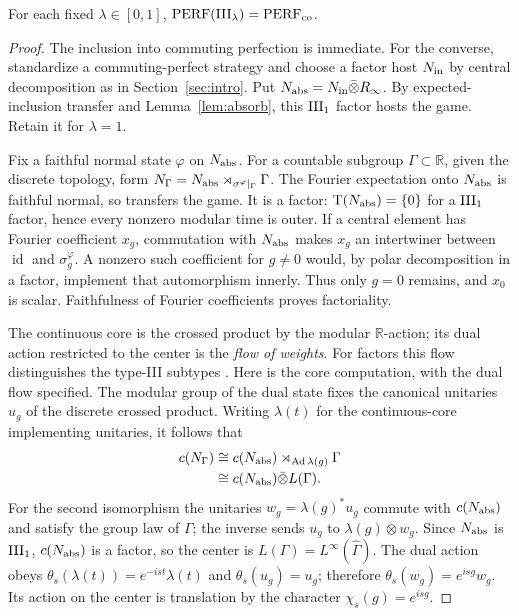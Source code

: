 \begin{theorem}\label{thm:III}
For each fixed $\lambda\in[0,1]$,
$\mathrm{PERF}(\mathrm{III}_\lambda)=\mathrm{PERF}_{\mathrm{co}}$.
\end{theorem}
\begin{proof}
The inclusion into commuting perfection is immediate.
For the converse, standardize a commuting-perfect strategy and
choose a factor host $N_{\rm in}$ by central decomposition as in
Section~\ref{sec:intro}. Put $N_{\rm abs}=N_{\rm in}\bar\otimes R_\infty$.
By expected-inclusion transfer and Lemma~\ref{lem:absorb}, this $\mathrm{III}_1$
factor hosts the game. Retain it for $\lambda=1$.

Fix a faithful normal state $\varphi$ on $N_{\rm abs}$.
For a countable subgroup $\Gamma\subset\mathbb R$, given the discrete
topology, form
$N_\Gamma=N_{\rm abs}\rtimes_{\sigma^\varphi|_\Gamma}\Gamma$.
The Fourier expectation onto $N_{\rm abs}$ is faithful normal, so transfers
the game. It is a factor: $\mathrm T(N_{\rm abs})=\{0\}$ for a $\mathrm{III}_1$ factor, hence
every nonzero modular time is outer.
If a central element has Fourier coefficient $x_g$, commutation
with $N_{\rm abs}$ makes $x_g$ an intertwiner between $\operatorname{id}$ and
$\sigma_g^\varphi$. A nonzero such coefficient for $g\ne0$ would,
by polar decomposition in a factor, implement that automorphism
innerly. Thus only $g=0$ remains, and $x_0$ is scalar.
Faithfulness of Fourier coefficients proves factoriality.

The continuous core is the crossed product by the modular
$\mathbb R$-action; its dual action restricted to the center is the
\emph{flow of weights}. For factors this flow distinguishes the
type-III subtypes \cite{ConnesTakesaki}.
Here is the core computation, with the dual flow specified.
The modular group of the dual state fixes the canonical unitaries
$u_g$ of the discrete crossed product. Writing $\lambda(t)$ for
the continuous-core implementing unitaries, it follows that
\begin{equation}\label{eq:core}
 \begin{split}
 c(N_\Gamma)
 &\cong c(N_{\rm abs})\rtimes_{\operatorname{Ad}\lambda(g)}\Gamma\\
 &\cong c(N_{\rm abs})\bar\otimes L(\Gamma).
 \end{split}
\end{equation}
For the second isomorphism the unitaries
$w_g=\lambda(g)^*u_g$ commute with $c(N_{\rm abs})$ and satisfy the group
law of $\Gamma$; the inverse sends $u_g$ to $\lambda(g)\otimes w_g$.
Since $N_{\rm abs}$ is $\mathrm{III}_1$, $c(N_{\rm abs})$ is a factor, so the center is
$L(\Gamma)=L^\infty(\widehat\Gamma)$.
The dual action obeys
$\theta_s(\lambda(t))=e^{-ist}\lambda(t)$ and
$\theta_s(u_g)=u_g$; therefore
$\theta_s(w_g)=e^{isg}w_g$.
Its action on the center is translation by the character
$\chi_s(g)=e^{isg}$.


\end{proof}
